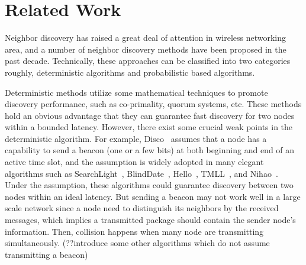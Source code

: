 \section{Related Work}
\label{RW}









Neighbor discovery has raised a great deal of attention in wireless networking area\cite{sun2014energy,XX,XX}, and a number of neighbor discovery methods have been proposed in the past decade.
Technically, these approaches can be classified into two categories roughly, deterministic algorithms and probabilistic based algorithms.

Deterministic methods utilize some mathematical techniques to promote discovery performance, such as co-primality, quorum systems, etc\cite{dutta2008practical,kandhalu2010u,
bakht2012searchlight,sun2014hello,chen2015heterogeneous,
wang2015blinddate,qiu2016talk}. These methods hold an obvious advantage that they can guarantee fast discovery for two nodes within a bounded latency. 
However, there exist some crucial weak points in the deterministic algorithm.
For example, Disco~\cite{dutta2008practical} assumes that a node has a capability to send a beacon (one or a few bits) at both beginning and end of an active time slot, and the assumption is widely adopted in many elegant algorithms such as
SearchLight~\cite{bakht2012searchlight}, BlindDate~\cite{wang2015blinddate}, Hello~\cite{sun2014hello}, TMLL~\cite{XX}, and Nihao~\cite{qiu2016talk}.
Under the assumption, these algorithms could guarantee discovery between two nodes within an ideal latency. But sending a beacon may not work well in a large scale network since a node need to distinguish its neighbors by the received messages, which implies a transmitted package should contain the sender node's information\cite{zhou2004impact}. Then, collision happens when many node are transmitting simultaneously. (??introduce some other algorithms which do not assume transmitting a beacon)

